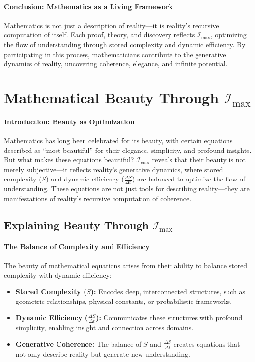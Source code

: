\documentclass[12pt]{article}
\begin{document}
\paragraph{Conclusion: Mathematics as a Living Framework}
Mathematics is not just a description of reality—it is reality’s recursive computation of itself. Each proof, theory, and discovery reflects \(\mathcal{I}_{\text{max}}\), optimizing the flow of understanding through stored complexity and dynamic efficiency. By participating in this process, mathematicians contribute to the generative dynamics of reality, uncovering coherence, elegance, and infinite potential.


\section{Mathematical Beauty Through \(\mathcal{I}_{\text{max}}\)}

\paragraph{Introduction: Beauty as Optimization}
Mathematics has long been celebrated for its beauty, with certain equations described as “most beautiful” for their elegance, simplicity, and profound insights. But what makes these equations beautiful? \(\mathcal{I}_{\text{max}}\) reveals that their beauty is not merely subjective—it reflects reality’s generative dynamics, where stored complexity (\(S\)) and dynamic efficiency (\(\frac{\Delta S}{\Delta t}\)) are balanced to optimize the flow of understanding. These equations are not just tools for describing reality—they are manifestations of reality’s recursive computation of coherence.

\subsection{Explaining Beauty Through \(\mathcal{I}_{\text{max}}\)}

\paragraph{The Balance of Complexity and Efficiency}
The beauty of mathematical equations arises from their ability to balance stored complexity with dynamic efficiency:
\begin{itemize}
    \item \textbf{Stored Complexity (\(S\)):} Encodes deep, interconnected structures, such as geometric relationships, physical constants, or probabilistic frameworks.
    \item \textbf{Dynamic Efficiency (\(\frac{\Delta S}{\Delta t}\)):} Communicates these structures with profound simplicity, enabling insight and connection across domains.
    \item \textbf{Generative Coherence:} The balance of \(S\) and \(\frac{\Delta S}{\Delta t}\) creates equations that not only describe reality but generate new understanding.
\end{itemize}
\end{document}
